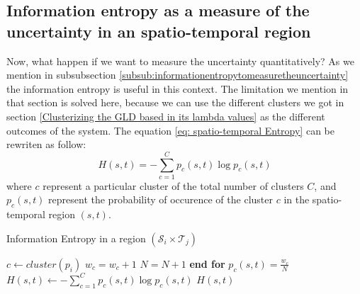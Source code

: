 \subsection{Information entropy as a measure of the uncertainty in an spatio-temporal region}
\label{sub:InfomationEntropyRegionWorkflow}
Now, what happen if we want to measure the uncertainty quantitatively? As we mention in subsubsection \ref{subsub:informationentropytomeasuretheuncertainty} the information entropy is useful in this context. The limitation we mention in that section is solved here, because we can use the different clusters we got in section \ref{Clusterizing the GLD based in its lambda values} as the different outcomes of the system. 
The equation \ref{eq: spatio-temporal Entropy} can be rewriten as follow:
\begin{equation}\label{eq: spatio-temporal EntropyWorkflow}
H(s,t)=-\sum_{c=1}^C p_{c}(s,t)\log p_{c}(s,t)
\end{equation}
where $c$ represent a particular cluster of the total number of clusters $C$, and $p_{c}(s,t)$ represent the probability of occurence of the cluster $c$ in the spatio-temporal region $(s,t)$.

\begin{algorithm} 
\caption{Information Entropy in a region $(\mathcal{S}_{i} \times \mathcal{T}_{j})$}\label{alg:informationEntropy}
\begin{algorithmic}[1] 
\State $c \gets cluster(p_i)$
\State $w_c= w_c+1$
\State $N=N+1$
\EndFor
\State \textbf{end for}
\State $p_{c}(s,t)= \frac{w_c}{N}$
\State $H(s, t) \gets -\sum_{c=1}^C p_{c}(s,t)\log p_{c}(s,t)$
\State \Return $H(s, t)$
\EndFunction 
\end{algorithmic} 
\end{algorithm} 


